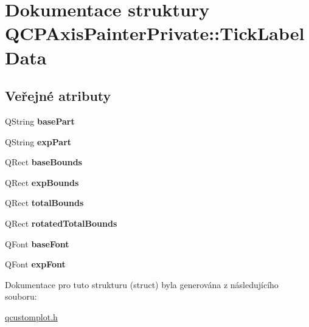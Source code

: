 \hypertarget{structQCPAxisPainterPrivate_1_1TickLabelData}{}\section{Dokumentace struktury Q\+C\+P\+Axis\+Painter\+Private\+:\+:Tick\+Label\+Data}
\label{structQCPAxisPainterPrivate_1_1TickLabelData}
\subsection*{Veřejné atributy}
\begin{DoxyCompactItemize}
\item 
\hypertarget{structQCPAxisPainterPrivate_1_1TickLabelData_ad65b76a5cafc412179a20b5d79809fc4}{}Q\+String {\bfseries base\+Part}\label{structQCPAxisPainterPrivate_1_1TickLabelData_ad65b76a5cafc412179a20b5d79809fc4}

\item 
\hypertarget{structQCPAxisPainterPrivate_1_1TickLabelData_a09692e4ea092137278b4ac051d5fdf2b}{}Q\+String {\bfseries exp\+Part}\label{structQCPAxisPainterPrivate_1_1TickLabelData_a09692e4ea092137278b4ac051d5fdf2b}

\item 
\hypertarget{structQCPAxisPainterPrivate_1_1TickLabelData_aac1047ae6ab8e9f5a42923082aabfff5}{}Q\+Rect {\bfseries base\+Bounds}\label{structQCPAxisPainterPrivate_1_1TickLabelData_aac1047ae6ab8e9f5a42923082aabfff5}

\item 
\hypertarget{structQCPAxisPainterPrivate_1_1TickLabelData_a6722d2bcefb93011e9dc42301b966846}{}Q\+Rect {\bfseries exp\+Bounds}\label{structQCPAxisPainterPrivate_1_1TickLabelData_a6722d2bcefb93011e9dc42301b966846}

\item 
\hypertarget{structQCPAxisPainterPrivate_1_1TickLabelData_afbb3163cf4c628914f1b703945419ea5}{}Q\+Rect {\bfseries total\+Bounds}\label{structQCPAxisPainterPrivate_1_1TickLabelData_afbb3163cf4c628914f1b703945419ea5}

\item 
\hypertarget{structQCPAxisPainterPrivate_1_1TickLabelData_aa4d38c5ea47c9184a78ee33ae7f1012e}{}Q\+Rect {\bfseries rotated\+Total\+Bounds}\label{structQCPAxisPainterPrivate_1_1TickLabelData_aa4d38c5ea47c9184a78ee33ae7f1012e}

\item 
\hypertarget{structQCPAxisPainterPrivate_1_1TickLabelData_a0d4958a706debaa8d19a9b65fc090d56}{}Q\+Font {\bfseries base\+Font}\label{structQCPAxisPainterPrivate_1_1TickLabelData_a0d4958a706debaa8d19a9b65fc090d56}

\item 
\hypertarget{structQCPAxisPainterPrivate_1_1TickLabelData_adc10767ebcb719d6927c012a38b9d933}{}Q\+Font {\bfseries exp\+Font}\label{structQCPAxisPainterPrivate_1_1TickLabelData_adc10767ebcb719d6927c012a38b9d933}

\end{DoxyCompactItemize}


Dokumentace pro tuto strukturu (struct) byla generována z následujícího souboru\+:\begin{DoxyCompactItemize}
\item 
\hyperlink{qcustomplot_8h}{qcustomplot.\+h}\end{DoxyCompactItemize}
